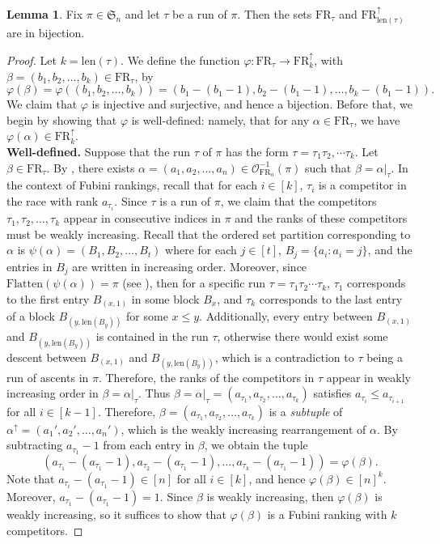 \documentclass{amsart}
\newcommand{\Flatten}[0]{\mathrm{Flatten}}
\theoremstyle{definition}
\newtheorem{lemma}{Lemma}[section]
\theoremstyle{definition}
\theoremstyle{remark}
\newcommand{\FR}[1]{\mathrm{FR}_{#1}}
\newcommand{\out}{\mathcal{O}}
\newcommand{\len}{\mathrm{len}}
\newcommand{\Sym}{\mathfrak{S}}
\begin{document}
\begin{lemma}\label{lem:save us}
Fix $\pi\in\Sym_n$ and let $\tau$ be a run of $\pi$. Then the sets $\FR{\tau}$ and $\FR{\len(\tau)}^{\uparrow}$ are in bijection.
\end{lemma}
\begin{proof}
    Let $k = \len(\tau)$. We define the function $\varphi : \FR{\tau} \to \FR{k}^{\uparrow}$, with $\beta=(b_1,b_2,\ldots,b_k)\in \FR{\tau}$, by
    \[\varphi(\beta) = \varphi((b_1, b_2, \ldots, b_k)) = (b_1 - (b_1-1), b_2 - (b_1-1), \ldots, b_k - (b_1-1)).\]
    We claim that $\varphi$ is injective and surjective, and hence a bijection. 
    Before that, we begin by showing that $\varphi$ is well-defined: namely, that for any $\alpha \in \FR{\tau}$, we have $\varphi(\alpha) \in \FR{k}^{\uparrow}$.\\
    
    \noindent\textbf{Well-defined.} 
    Suppose
    that the run $\tau$ of $\pi$ has the form $\tau= \tau_1 \tau_2, \cdots \tau_k$. 
        Let $\beta\in\FR{\tau}$. 
        By , there exists
    $\alpha=(a_1,a_2,\ldots,a_n)\in\out_{\FR{n}}^{-1}(\pi)$ such that $\beta=\alpha|_{\tau}$.
    In the context of Fubini rankings, recall that for each $i\in[k]$, $\tau_i$ is a competitor in the race with rank $a_{\tau_i}$.
    Since  $\tau$ is a run of $\pi$, we claim that the competitors $\tau_1, \tau_2, \ldots, \tau_k$ appear in consecutive indices in $\pi$ and the ranks of these competitors must be weakly increasing.
    Recall that the ordered set partition corresponding to $\alpha$ is $\psi(\alpha)=(B_1,B_2,\ldots,B_t)$ where for each $j\in[t]$, $B_j=\{a_i:a_i=j\}$, and the entries in $B_j$ are written in increasing order. Moreover, since $\Flatten(\psi(\alpha))=\pi$ (see ), then for a specific run $\tau=\tau_1\tau_2\cdots\tau_k$, $\tau_1$ corresponds to the first entry $B_{(x,1)}$ in some block $B_x$, and $\tau_k$ corresponds to the last entry of a block $B_{(y,\len(B_y))}$ for some $x\leq y$. 
    Additionally, every entry between $B_{(x,1)}$ and $B_{(y,\len(B_y))}$ is contained in the run $\tau$, otherwise there would exist some descent between $B_{(x,1)}$ and $B_{(y,\len(B_y))}$, which is a contradiction to $\tau$ being a run of ascents in $\pi$. Therefore, the ranks of the competitors in $\tau$ appear in weakly increasing order in $\beta=\alpha|_\tau$.
    Thus $\beta=\alpha|_\tau=(a_{\tau_1},a_{\tau_2},\ldots,a_{\tau_k})$ satisfies $a_{\tau_i}\leq a_{\tau_{i+1}}$ for all $i\in[k-1]$.
    Therefore, $\beta = (a_{\tau_1}, a_{\tau_2}, \ldots, a_{\tau_k})$ is a \textit{subtuple} of $\alpha^{\uparrow}=(a_1',a_2',\ldots,a_n')$, which is the weakly increasing rearrangement of $\alpha$.  
    By subtracting $a_{\tau_1}-1$ from each entry in $\beta$,
    we obtain the tuple 
    \[(a_{\tau_1}-(a_{\tau_1}-1),a_{\tau_2}-(a_{\tau_1}-1),\ldots,a_{\tau_k}-(a_{\tau_1}-1))= \varphi(\beta).\] 
    Note that $a_{\tau_i}-(a_{\tau_1}-1)\in [n]$ for all $i\in[k]$, and hence $\varphi(\beta) \in [n]^k$.
    Moreover,  $a_{\tau_1}-(a_{\tau_1}-1)=1$. 
    Since $\beta$
    is weakly increasing, then $\varphi(\beta)$ is weakly increasing, so it suffices to 
    show that $\varphi(\beta)$ is a Fubini ranking with $k$ competitors.


\end{proof}
\end{document}
